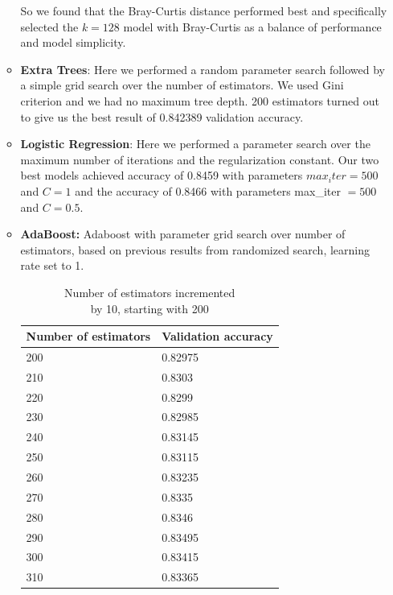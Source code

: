 \begin{itemize}
\begin{itemize}
So we found that the Bray-Curtis distance performed best and specifically selected the $k=128$ model with Bray-Curtis as a balance of performance and model simplicity.
\item \textbf{Extra Trees}: Here we performed a random parameter search followed by a simple grid search over the number of estimators. We used Gini criterion and we had no maximum tree depth. 200 estimators turned out to give us the best result of 0.842389 validation accuracy.
\item \textbf{Logistic Regression}: Here we performed a parameter search over the maximum number of iterations and the regularization constant. Our two best models achieved accuracy of 0.8459 with parameters $max_iter = 500$ and $C=1$ and the accuracy of 0.8466 with parameters max_iter $= 500$ and $C=0.5$.
    \item \textbf{AdaBoost:} Adaboost with parameter grid search over number of estimators, based on previous results from randomized search, learning rate set to 1. \\
    \begin{table}[H]
\label{adaboost}
\begin{minipage}[t]{.48\linewidth}
\caption{Number of estimators incremented \\ by 10, starting with 200}
      \centering
\begin{tabular}{|l|l|}
\hline
Number of estimators & Validation accuracy \\ \hline
200                  & 0.82975             \\ \hline
210                  & 0.8303              \\ \hline
220                  & 0.8299              \\ \hline
230                  & 0.82985             \\ \hline
240                  & 0.83145             \\ \hline
250                  & 0.83115             \\ \hline
260                  & 0.83235             \\ \hline
270                  & 0.8335              \\ \hline
280                  & 0.8346              \\ \hline
290                  & 0.83495             \\ \hline
300                  & 0.83415             \\ \hline
310                  & 0.83365             \\ \hline

\end{tabular}
\end{minipage}
\end{table}
\end{itemize}
\end{itemize}
